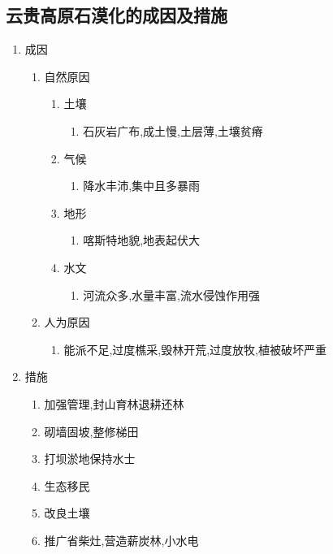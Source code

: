 \documentclass[a4paper]{article}
\begin{document}
    \subsection{云贵高原石漠化的成因及措施}
    \begin{enumerate}
        \item 成因
        \begin{enumerate}
            \item 自然原因
            \begin{enumerate}
                \item 土壤
                \begin{enumerate}
                    \item 石灰岩广布,成土慢,土层薄,土壤贫瘠
                \end{enumerate}
                \item 气候
                \begin{enumerate}
                    \item 降水丰沛,集中且多暴雨
                \end{enumerate}
                \item 地形
                \begin{enumerate}
                    \item 喀斯特地貌,地表起伏大
                \end{enumerate}
                \item 水文
                \begin{enumerate}
                    \item 河流众多,水量丰富,流水侵蚀作用强
                \end{enumerate}
            \end{enumerate}
            \item 人为原因
            \begin{enumerate}
                \item 能派不足,过度樵采,毁林开荒,过度放牧,植被破坏严重
            \end{enumerate}
        \end{enumerate}
        \item 措施
        \begin{enumerate}
            \item 加强管理,封山育林退耕还林
            \item 砌墙固坡,整修梯田
            \item 打坝淤地保持水士
            \item 生态移民
            \item 改良土壤
            \item 推广省柴灶,营造薪炭林,小水电
        \end{enumerate}
    \end{enumerate}
\end{document}
